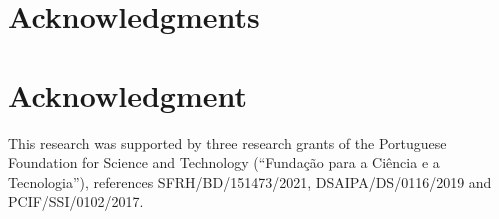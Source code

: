 \documentclass[10pt,journal,compsoc]{IEEEtran}
\begin{document}
%
%


\ifCLASSOPTIONcompsoc
  \section*{Acknowledgments}
\else
  \section*{Acknowledgment}
\fi


This research was supported by three research grants of the Portuguese Foundation
for Science and Technology (``Fundação para a Ciência e a Tecnologia''),
references SFRH/BD/151473/2021, DSAIPA/DS/0116/2019 and PCIF/SSI/0102/2017.






\end{document}
